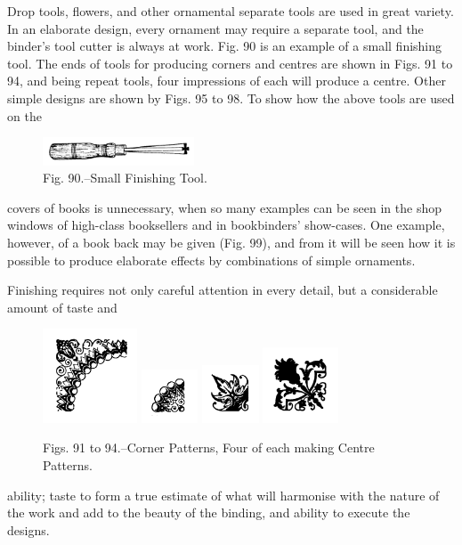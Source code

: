 \documentclass[twoside]{book}
\begin{document}
Drop tools, flowers, and other ornamental separate
tools are used in great variety. In an elaborate
\pagebreak
design, every ornament may require a separate tool,
and the binder's tool cutter is always at work.
Fig. 90 is an example of a small finishing tool.
The ends of tools for producing corners and
centres are shown in Figs. 91 to 94, and being repeat
tools, four impressions of each will produce a centre.
Other simple designs are shown by Figs. 95 to 98.
To show how the above tools are used on the
	\begin{figure}[h]
		\centering
		\includegraphics[width=0.4\textwidth]{Figures/_090.png}
		\caption*{Fig. 90.--Small Finishing Tool.}
	\end{figure}
covers of books is unnecessary, when so many examples
can be seen in the shop windows of high-class
booksellers and in bookbinders' show-cases. One
example, however, of a book back may be given
(Fig. 99), and from it will be seen how it is possible
to produce elaborate effects by combinations of
simple ornaments.

Finishing requires not only careful attention in
every detail, but a considerable amount of taste and
	\begin{figure}[h]
		\centering
		\includegraphics[width=0.25\textwidth]{Figures/_091.png}
		\includegraphics[width=0.15\textwidth]{Figures/_092.png}
		\includegraphics[width=0.15\textwidth]{Figures/_093.png}
		\includegraphics[width=0.2\textwidth]{Figures/_094.png}
		\caption*{Figs. 91 to 94.--Corner Patterns, Four of each making Centre Patterns.}
	\end{figure}
ability; taste to form a true estimate of what will
harmonise with the nature of the work and add to
the beauty of the binding, and ability to execute the
designs.
\end{document}
